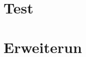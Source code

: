 \section{Test}
\lorem

\section{Erweiterun}
\lorem

\lorem
\vspace{2cm}
\lorem

\lorem
\lorem
\lorem
\lorem
